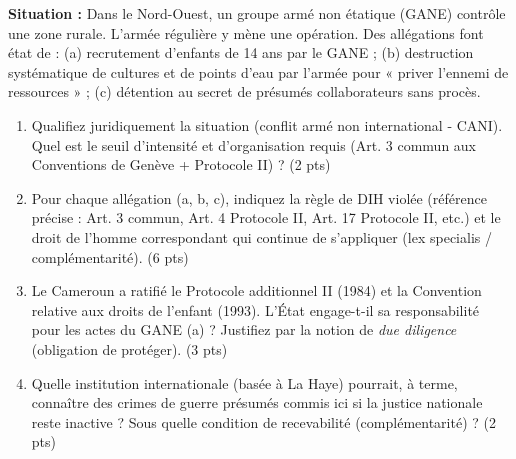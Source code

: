 \documentclass[11pt]{article}
\begin{document}
\begin{exercice}
\label{exo:dhi}
\textbf{Situation :} Dans le Nord-Ouest, un groupe armé non étatique (GANE) contrôle une zone rurale. L'armée régulière y mène une opération. Des allégations font état de : (a) recrutement d'enfants de 14 ans par le GANE ; (b) destruction systématique de cultures et de points d'eau par l'armée pour « priver l'ennemi de ressources » ; (c) détention au secret de présumés collaborateurs sans procès.
\begin{enumerate}
    \item Qualifiez juridiquement la situation (conflit armé non international - CANI). Quel est le seuil d'intensité et d'organisation requis (Art. 3 commun aux Conventions de Genève + Protocole II) ? \hfill (2 pts)
    \item Pour chaque allégation (a, b, c), indiquez la règle de DIH violée (référence précise : Art. 3 commun, Art. 4 Protocole II, Art. 17 Protocole II, etc.) et le droit de l'homme correspondant qui continue de s'appliquer (lex specialis / complémentarité). \hfill (6 pts)
    \item Le Cameroun a ratifié le Protocole additionnel II (1984) et la Convention relative aux droits de l'enfant (1993). L'État engage-t-il sa responsabilité pour les actes du GANE (a) ? Justifiez par la notion de \emph{due diligence} (obligation de protéger). \hfill (3 pts)
    \item Quelle institution internationale (basée à La Haye) pourrait, à terme, connaître des crimes de guerre présumés commis ici si la justice nationale reste inactive ? Sous quelle condition de recevabilité (complémentarité) ? \hfill (2 pts)
\end{enumerate}
\end{exercice}
\end{document}
